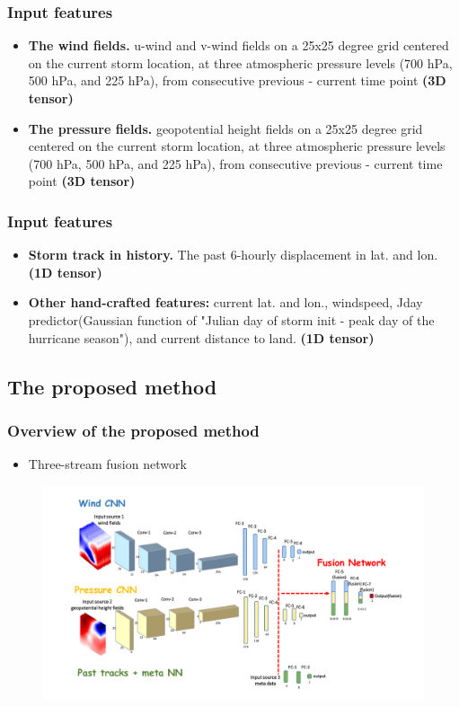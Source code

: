 \documentclass{beamer}
\begin{document}
\begin{frame}
\frametitle{Input features}
\begin{itemize}
	\item \textbf{The wind fields.} u-wind and v-wind fields on a 25x25 degree grid centered on the current storm location, at three atmospheric pressure levels (700 hPa, 500 hPa, and 225 hPa),  from consecutive previous - current time point \textbf{(3D tensor)}
	\item \textbf{The pressure fields.} geopotential height fields on a 25x25 degree grid centered on the current storm location, at three atmospheric pressure levels (700 hPa, 500 hPa, and 225 hPa), from consecutive previous - current time point \textbf{(3D tensor)}
	
\end{itemize}
\end{frame}

\begin{frame}
\frametitle{Input features}
\begin{itemize}
\item \textbf{Storm track in history.}  The past 6-hourly displacement in lat. and lon. \textbf{(1D tensor)} 
\item \textbf{Other hand-crafted features:} current lat. and lon.,  windspeed, Jday predictor(Gaussian function of "Julian day of storm init - peak day of the hurricane season"\cite{demaria2005further}), and current distance to land.  \textbf{(1D tensor)} 

\end{itemize}
\end{frame}


\subsection{The proposed method}
\begin{frame}
\frametitle{Overview of the proposed method}
\begin{itemize}
	\item  Three-stream fusion network \\
\end{itemize}
\begin{figure}
	\includegraphics[width=1.0\linewidth]{figs/fusion_network.pdf}
\end{figure}
\end{frame}
\end{document}
